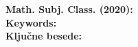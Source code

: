 \noindent
\textbf{Math. Subj. Class. (2020):} \@klasifikacija \\[1mm]
\def\sep{, } %
\textbf{Keywords:} \@keywords \\[1mm]
\textbf{Ključne besede:} \@kljucnebesede
